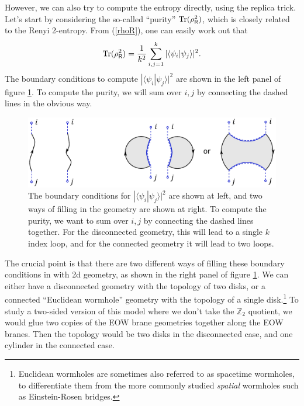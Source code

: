 \documentclass[11pt]{article}
\newcommand{\be}{\begin{equation}}
\newcommand{\ee}{\end{equation}}
\numberwithin{equation}{section}
\def\tr{\text{Tr}}
\begin{document}
However, we can also try to compute the entropy directly, using the replica trick. Let's start by considering the so-called ``purity'' $\tr(\rho_{\sf{R}}^2)$, which is closely related to the Renyi 2-entropy. From (\ref{rhoR}), one can easily work out that
\be
\tr(\rho_{\sf{R}}^2) = \frac{1}{k^2}\sum_{i,j = 1}^k|\langle \psi_i|\psi_j\rangle|^2.\label{purityFormula}
\ee
The boundary conditions to compute $|\langle \psi_i|\psi_j\rangle|^2$ are shown in the left panel of figure \ref{fig1f}. To compute the purity, we will sum over $i,j$ by connecting the dashed lines in the obvious way.

\begin{figure}[t]
\begin{center}
\includegraphics[scale = .75]{images/1f.pdf}
\caption{{\small The boundary conditions for $|\langle \psi_i|\psi_j\rangle|^2$ are shown at left, and two ways of filling in the geometry are shown at right. To compute the purity, we want to sum over $i,j$ by connecting the dashed lines together. For the disconnected geometry, this will lead to a single $k$ index loop, and for the connected geometry it will lead to two loops.}}\label{fig1f}
\end{center}
\end{figure}
The crucial point is that there are two different ways of filling these boundary conditions in with 2d geometry, as shown in the right panel of figure \ref{fig1f}. We can either have a disconnected geometry with the topology of two disks, or a connected ``Euclidean wormhole'' geometry with the topology of a single disk.\footnote{Euclidean wormholes are sometimes also referred to as spacetime wormholes, to differentiate them from the more commonly studied {\it spatial} wormholes such as Einstein-Rosen bridges.} To study a two-sided version of this model where we don't take the $\mathbb{Z}_2$ quotient, we would glue two copies of the EOW brane geometries together along the EOW branes. Then the topology would be two disks in the disconnected case, and one cylinder in the connected case.

\end{document}
